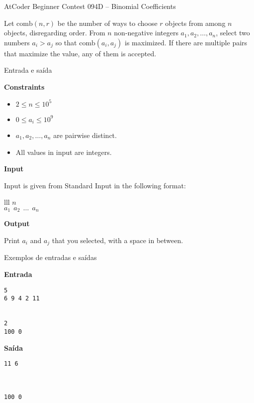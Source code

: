 \begin{frame}[fragile]{AtCoder Beginner Contest 094D -- Binomial Coefficients}

Let $\mathrm{comb}(n,r)$ be the number of ways to choose $r$ objects from among $n$ objects, disregarding order. From $n$ non-negative integers 
$a_1, a_2, \ldots, a_n$, select two numbers $a_i > a_j$ so that $\mathrm{comb}(a_i, a_j)$
 is maximized. If there are multiple pairs that maximize the value, any of them is accepted.

\end{frame}

\begin{frame}[fragile]{Entrada e saída}

\textbf{Constraints}

\begin{itemize}
    \item $2\leq n \leq 10^5$
    \item $0\leq a_i\leq 10^9$
    \item $a_1, a_2, \ldots, a_n$ are pairwise distinct.
    \item All values in input are integers.
\end{itemize}

\vspace{0.1in}

\textbf{Input}

Input is given from Standard Input in the following format:
\begin{atcoderio}{lll}
$n$ \\
$a_1\ \ a_2\ \ \ldots\ \ a_n$
\end{atcoderio}

\textbf{Output}

Print $a_i$ and $a_j$ that you selected, with a space in between.

\end{frame}

\begin{frame}[fragile]{Exemplos de entradas e saídas}

\begin{minipage}[t]{0.45\textwidth}
\textbf{Entrada}
\begin{verbatim}
5
6 9 4 2 11


2
100 0
\end{verbatim}
\end{minipage}
\begin{minipage}[t]{0.5\textwidth}
\textbf{Saída}
\begin{verbatim}
11 6



100 0
\end{verbatim}
\end{minipage}
\end{frame}



